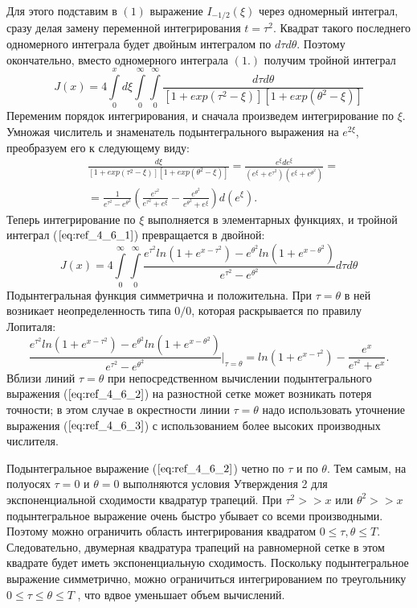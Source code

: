 Для этого подставим в $(1)$ выражение $I_{-1/2}(\xi)$ через одномерный
интеграл, сразу делая замену переменной интегрирования $t=\tau^2$. Квадрат
такого последнего одномерного интеграла будет двойным интегралом по $d\tau d\theta$.
Поэтому окончательно, вместо одномерного интеграла $(1.)$ получим тройной
интеграл
\begin{equation}
J(x)=4 \int\limits_0^x d\xi \int\limits_0^{\infty} \int\limits_0^{\infty} \frac{d\tau d\theta}{[1+exp(\tau^2-\xi)][1+exp(\theta^2-\xi)]} 
\label{eq:ref_4_6_1}
\end{equation}
Переменим порядок интегрирования, и сначала произведем интегрирование по
$\xi$. Умножая числитель и знаменатель подынтегрального выражения на $e^{2\xi}$,
преобразуем его к следующему виду:
\begin{equation}
\begin{aligned}
&\frac{d\xi}{[1+exp(\tau^2-\xi)][1+exp(\theta^2-\xi)]} = \frac{e^{\xi}de^{\xi}}{(e^{\xi} + e^{\tau^2})(e^{\xi} + e^{\theta^2})} =\\
&= \frac{1}{e^{\tau^2}-e^{\theta^2}} (\frac{e^{\tau^2}}{e^{\tau^2} + e^{\xi}}-\frac{e^{\theta^2}}{e^{\theta^2} + e^{\xi}}) d(e^{\xi}).
\end{aligned}
\end{equation}
Теперь интегрирование по $\xi$ выполняется в элементарных функциях, и
тройной интеграл ($\ref{eq:ref_4_6_1}$) превращается в двойной:
\begin{equation}
J(x) = 4\int\limits_0^{\infty} \int\limits_0^{\infty} \frac{e^{\tau^2} ln (1 + e^{x-\tau^2}) - e^{\theta^2} ln (1 + e^{x-\theta^2})}{e^{\tau^2} - e^{\theta^2}} d\tau d\theta
\label{eq:ref_4_6_2}
\end{equation}
Подынтегральная функция симметрична и положительна. При $\tau = \theta$ в ней
возникает неопределенность типа $0/0$, которая раскрывается по правилу
Лопиталя:
\begin{equation}
\frac{e^{\tau^2} ln (1 + e^{x-\tau^2}) - e^{\theta^2} ln (1 + e^{x-\theta^2})}{e^{\tau^2} - e^{\theta^2}} \Bigg|_{\tau = \theta} =ln(1+e^{x-\tau^2}) - \frac{e^x}{e^{\tau^2} + e^x}.
\label{eq_4_6_3}
\end{equation}
Вблизи линий $\tau = \theta$ при непосредственном вычислении подынтегрального
выражения ($\ref{eq:ref_4_6_2}$) на разностной сетке может возникать потеря точности; в этом
случае в окрестности линии $\tau = \theta$ надо использовать уточнение выражения ($\ref{eq:ref_4_6_3}$)
с использованием более высоких производных числителя.

Подынтегральное выражение ($\ref{eq:ref_4_6_2}$) четно по $\tau$ и по $\theta$. Тем самым, на
полуосях $\tau = 0$ и $\theta = 0$ выполняются условия Утверждения 2 для
экспоненциальной сходимости квадратур трапеций. При $\tau^2 >> x$ или $\theta^2 >> x$
подынтегральное выражение очень быстро убывает со всеми производными.
Поэтому можно ограничить область интегрирования квадратом $0 \leqslant \tau ,\theta \leqslant T$.
Следовательно, двумерная квадратура трапеций на равномерной сетке в этом
квадрате будет иметь экспоненциальную сходимость. Поскольку
подынтегральное выражение симметрично, можно ограничиться
интегрированием по треугольнику $0 \leqslant \tau \leqslant \theta \leqslant T$ , что вдвое уменьшает объем вычислений.

